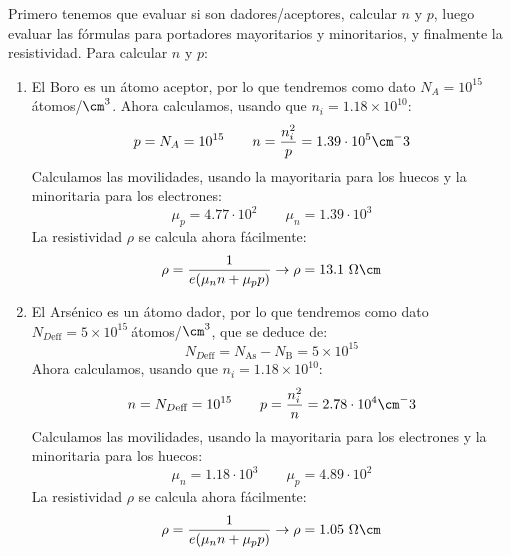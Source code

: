 	Primero tenemos que evaluar si son dadores/aceptores, calcular $n$ y $p$, luego evaluar las fórmulas para portadores mayoritarios y minoritarios, y finalmente la resistividad. Para calcular $n$ y $p$:
	\begin{enumerate}[label=\alph*)]
		\item El Boro es un átomo aceptor, por lo que tendremos como dato $N_A=10^{15} \ $átomos/$\cm^3$. Ahora calculamos, usando que $n_i=1.18\times 10^{10}$:
		\begin{equation}
			p = N_A = 10^{15} \qquad n = \frac{n_i^2}{p} =1.39 \cdot 10^5 \cm^-3
		\end{equation}
		Calculamos las movilidades, usando la mayoritaria para los huecos y la minoritaria para los electrones:
		\begin{equation}
			\mu_p=4.77\cdot 10^2 \qquad
			\mu_n=1.39 \cdot 10^3
		\end{equation}
		La resistividad $\rho$ se calcula ahora fácilmente:
		\begin{equation}
			\rho = \frac{1}{e(\mu_n n + \mu_pp)} \rightarrow
			\rho = 13.1 \ \Omega \cm
		\end{equation}

		\item El Arsénico es un átomo dador, por lo que tendremos como dato $N_{D\text{eff}}=5 \times 10^{15} \ $átomos/$\cm^3$, que se deduce de:
		\begin{equation}
			N_{D\text{eff}} = N_{\text{As}} - N_{\text{B}} = 5 \times 10^{15}
		\end{equation}
		Ahora calculamos, usando que $n_i=1.18\times 10^{10}$:
		\begin{equation}
			n = N_{D\text{eff}} = 10^{15} \qquad p = \frac{n_i^2}{n} = 2.78 \cdot 10^4 \cm^-3
		\end{equation}
		Calculamos las movilidades, usando la mayoritaria para los electrones y la minoritaria para los huecos:
		\begin{equation}
			\mu_n=1.18\cdot 10^3 \qquad
			\mu_p=4.89 \cdot 10^2
		\end{equation}
		La resistividad $\rho$ se calcula ahora fácilmente:
		\begin{equation}
			\rho = \frac{1}{e(\mu_n n + \mu_pp)} \rightarrow \rho = 1.05 \ \Omega \cm
		\end{equation}


\end{enumerate}
